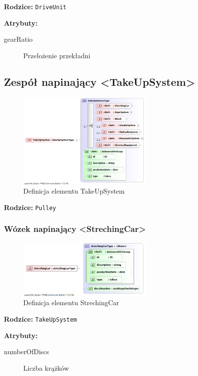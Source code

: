 \documentclass[12pt,a4paper]{article}
\begin{document}
\noindent\textbf{Rodzice:} \texttt{DriveUnit}

\noindent\textbf{Atrybuty:}
\begin{description}
\item[gearRatio] Przełożenie przekładni
\end{description}


\subsection{Zespół napinający <TakeUpSystem>}

\begin{figure}[H]
  \centering
  \includegraphics[width=0.6\textwidth]{png/liquid/TakeUpSystem}
  \caption{Definicja elementu TakeUpSystem}
  \label{fig:takeUpSystem-xsd}
\end{figure}

\noindent\textbf{Rodzice:} \texttt{Pulley}

\subsubsection{Wózek napinający <StrechingCar>}

\begin{figure}[H]
  \centering
  \includegraphics[width=0.6\textwidth]{png/liquid/StrechingCar}
  \caption{Definicja elementu StrechingCar}
  \label{fig:strechingCar-xsd}
\end{figure}

\noindent\textbf{Rodzice:} \texttt{TakeUpSystem}

\noindent\textbf{Atrybuty:}
\begin{description}
\item[numberOfDiscs] Liczba krążków
\end{description}
\end{document}
